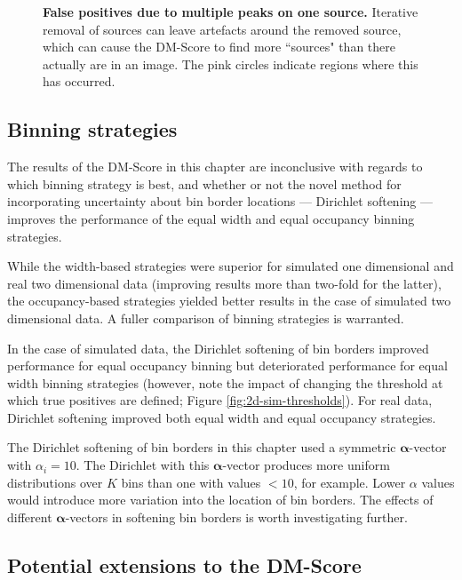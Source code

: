 \begin{figure}
\centering
{}
\caption[False positives due to multiple peaks on one source]{\textbf{False positives due to multiple peaks on one source.} Iterative removal of sources can leave artefacts around the removed source, which can cause the DM-Score to find more ``sources" than there actually are in an image. The pink circles indicate regions where this has occurred.} 
\label{fig:false-positives}
\end{figure}

\subsection{Binning strategies}

The results of the DM-Score in this chapter are inconclusive with regards to which binning strategy is best, and whether or not the novel method for incorporating uncertainty about bin border locations --- Dirichlet softening --- improves the performance of the equal width and equal occupancy binning strategies.

While the width-based strategies were superior for simulated one dimensional and real two dimensional data (improving results more than two-fold for the latter), the occupancy-based strategies yielded better results in the case of simulated two dimensional data. A fuller comparison of binning strategies is warranted.

In the case of simulated data, the Dirichlet softening of bin borders improved performance for equal occupancy binning but deteriorated performance for equal width binning strategies (however, note the impact of changing the threshold at which true positives are defined; Figure \ref{fig:2d-sim-thresholds}). For real data, Dirichlet softening improved both equal width and equal occupancy strategies.

The Dirichlet softening of bin borders in this chapter used a symmetric $\boldsymbol{\alpha}$-vector with $\alpha_i = 10$. The Dirichlet with this $\boldsymbol{\alpha}$-vector produces more uniform distributions over $K$ bins than one with values $< 10$, for example. Lower $\alpha$ values would introduce more variation into the location of bin borders. The effects of different $\boldsymbol{\alpha}$-vectors in softening bin borders is worth investigating further.

\subsection{Potential extensions to the DM-Score}

